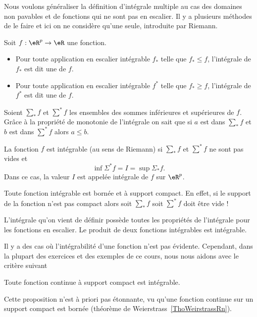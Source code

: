 Nous voulons généraliser la définition d'intégrale multiple au cas des domaines non pavables et de fonctions qui ne sont pas en escalier. Il y a plusieurs méthodes de le faire et ici on ne considère qu'une seule, introduite par Riemann.
\begin{definition} Soit \( f: \eR^p\to \eR\) une fonction.
	\begin{itemize}
		\item Pour toute application en escalier intégrable \( f_*\) telle que \( f_*\leq f\), l'intégrale de \( f_*\) est dit une  de \( f\).
		\item Pour toute application en escalier intégrable \( f^*\) telle que \( f_*\geq f\), l'intégrale de \( f^*\) est dit une  de \( f\).
	\end{itemize}
\end{definition}
Soient \( \sum_* f\) et  \( \sum^* f\) les ensembles des sommes inférieures et supérieures de \( f\). Grâce à la propriété de  monotonie de l'intégrale on sait que si \( a\) est dans \( \sum_* f\) et  \( b\) est dans \( \sum^* f\) alors \( a\leq b\).
\begin{definition}
	La fonction \( f\) est intégrable (au sens de Riemann) si \( \sum_* f\) et  \( \sum^* f\) ne sont pas vides et
	\[
		\inf \Sigma^* f=I =\sup \Sigma_* f.
	\]
	Dans ce cas, la valeur \( I\) est appelée intégrale de \( f\) sur \( \eR^p\).
\end{definition}
\begin{remark}
	Toute fonction intégrable est bornée et à support compact. En effet, si le support de la  fonction n'est pas compact alors soit \( \sum_* f\) soit \( \sum^* f\) doit être vide !
\end{remark}
L'intégrale qu'on vient de définir possède toutes les propriétés de l'intégrale pour les fonctions en escalier. Le produit de deux fonctions intégrables est intégrable.

Il y a des cas où l'intégrabilité d'une fonction n'est pas évidente. Cependant, dans la plupart des exercices et des exemples de ce cours, nous nous aidons avec le critère suivant
\begin{proposition}
	Toute fonction continue à support compact est intégrable.
\end{proposition}
Cette proposition n'est à priori pas étonnante, vu qu'une fonction continue sur un support compact est bornée (théorème de Weierstrass~\ref{ThoWeirstrassRn}).

